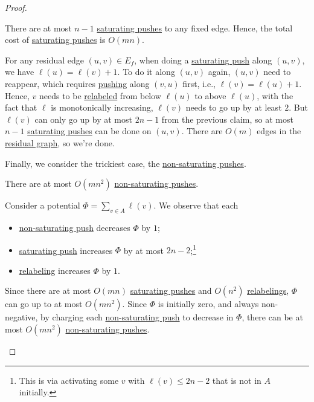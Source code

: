 \begin{proof}
	\begin{claim}
		There are at most \(n-1\) \hyperref[algo:push-relabel-push-saturating]{saturating pushes} to any fixed edge. Hence, the total cost of \hyperref[algo:push-relabel-push-saturating]{saturating pushes} is \(O(mn)\).
	\end{claim}
	\begin{explanation}
		For any residual edge \((u, v) \in E_f\), when doing a \hyperref[algo:push-relabel-push-saturating]{saturating push} along \((u, v)\), we have \(\ell (u) = \ell (v) + 1\). To do it along \((u, v)\) again, \((u, v)\) need to reappear, which requires \hyperref[algo:push-relabel-push]{pushing} along \((v, u)\) first, i.e., \(\ell (v) = \ell (u) + 1\). Hence, \(v\) needs to be \hyperref[algo:push-relabel-relabel]{relabeled} from below \(\ell (u)\) to above \(\ell (u)\), with the fact that \(\ell \) is monotonically increasing, \(\ell (v)\) needs to go up by at least \(2\). But \(\ell (v)\) can only go up by at most \(2n-1\) from the previous claim, so at most \(n - 1\) \hyperref[algo:push-relabel-push-saturating]{saturating pushes} can be done on \((u, v)\). There are \(O(m)\) edges in the \hyperref[def:residual-graph]{residual graph}, so we're done.
	\end{explanation}

	Finally, we consider the trickiest case, the \hyperref[algo:push-relabel-push-non-saturating]{non-saturating pushes}.

	\begin{claim}
		There are at most \(O(mn^2)\) \hyperref[algo:push-relabel-push-non-saturating]{non-saturating pushes}.
	\end{claim}
	\begin{explanation}
		Consider a potential \(\Phi = \sum_{v \in A} \ell (v)\). We observe that each
		\begin{itemize}
			\item \hyperref[algo:push-relabel-push-non-saturating]{non-saturating push} decreases \(\Phi \) by \(1\);
			\item \hyperref[algo:push-relabel-push-saturating]{saturating push} increases \(\Phi \) by at most \(2n-2\);\footnote{This is via activating some \(v\) with \(\ell (v) \leq 2n - 2\) that is not in \(A\) initially.}
			\item \hyperref[algo:push-relabel-relabel]{relabeling} increases \(\Phi \) by \(1\).
		\end{itemize}

		Since there are at most \(O(mn)\) \hyperref[algo:push-relabel-push-saturating]{saturating pushes} and \(O(n^2)\) \hyperref[algo:push-relabel-relabel]{relabelings}, \(\Phi \) can go up to at most \(O(mn^2)\). Since \(\Phi \) is initially zero, and always non-negative, by charging each \hyperref[algo:push-relabel-push-non-saturating]{non-saturating push} to decrease in \(\Phi \), there can be at most \(O(mn^2)\) \hyperref[algo:push-relabel-push-non-saturating]{non-saturating pushes}.
	\end{explanation}


\end{proof}
